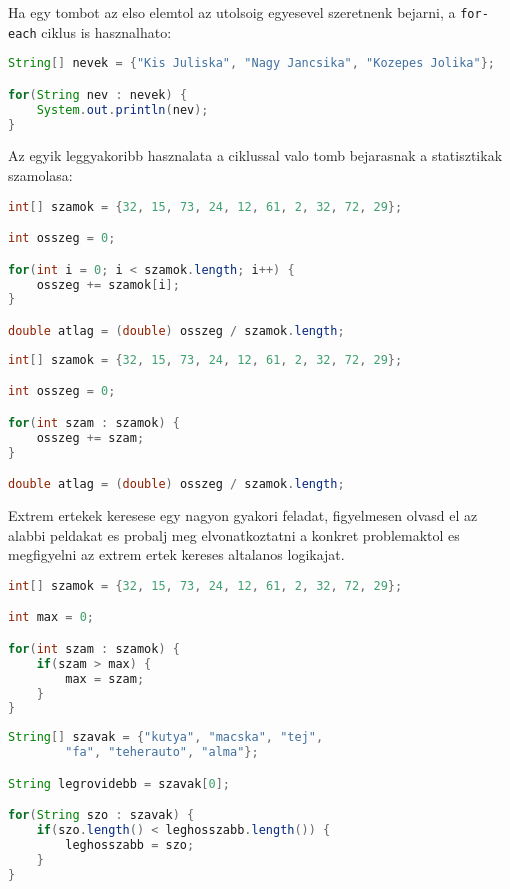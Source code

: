 \documentclass{article}
\begin{document}
Ha egy tombot az elso elemtol az utolsoig egyesevel szeretnenk bejarni, a \lstinline{for-each} ciklus is hasznalhato:
\begin{lstlisting}[language=Java, caption=Tomb elemeinek megjelenitese for-each ciklussal]
String[] nevek = {"Kis Juliska", "Nagy Jancsika", "Kozepes Jolika"};

for(String nev : nevek) {
    System.out.println(nev);
}
\end{lstlisting}


Az egyik leggyakoribb hasznalata a ciklussal valo tomb bejarasnak a statisztikak szamolasa:
\begin{lstlisting}[language=Java, caption=Atlagszamolas for ciklussal]
int[] szamok = {32, 15, 73, 24, 12, 61, 2, 32, 72, 29};

int osszeg = 0;

for(int i = 0; i < szamok.length; i++) {
    osszeg += szamok[i];
}

double atlag = (double) osszeg / szamok.length;
\end{lstlisting}

\newpage

\begin{lstlisting}[language=Java, caption=Atlagszamolas for-each ciklussal]
int[] szamok = {32, 15, 73, 24, 12, 61, 2, 32, 72, 29};

int osszeg = 0;

for(int szam : szamok) {
    osszeg += szam;
}

double atlag = (double) osszeg / szamok.length;
\end{lstlisting}

Extrem ertekek keresese egy nagyon gyakori feladat, figyelmesen olvasd el az alabbi peldakat es probalj meg elvonatkoztatni a konkret problemaktol es megfigyelni az extrem ertek kereses altalanos logikajat.

\begin{lstlisting}[language=Java, caption=Maximum ertek kereses]
int[] szamok = {32, 15, 73, 24, 12, 61, 2, 32, 72, 29};

int max = 0;

for(int szam : szamok) {
    if(szam > max) {
        max = szam;
    }
}
\end{lstlisting}

\begin{lstlisting}[language=Java, caption=Legrovidebb String kereses]
String[] szavak = {"kutya", "macska", "tej",
        "fa", "teherauto", "alma"};

String legrovidebb = szavak[0];

for(String szo : szavak) {
    if(szo.length() < leghosszabb.length()) {
        leghosszabb = szo;
    }
}
\end{lstlisting}
\end{document}

